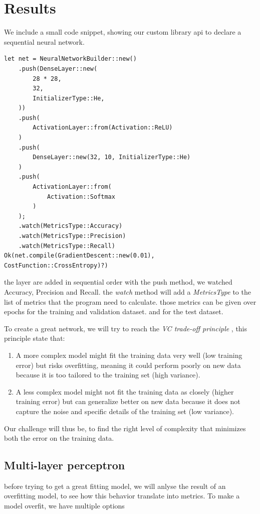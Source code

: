 \documentclass[a4paper, twocolumn, twoside]{article}
\begin{document}
	\section{Results}
	We include a small code snippet, showing our custom library api to declare a sequential neural network.

	\begin{verbatim}
let net = NeuralNetworkBuilder::new()
	.push(DenseLayer::new(
		28 * 28,
		32,
		InitializerType::He,
	))
	.push(
		ActivationLayer::from(Activation::ReLU)
	)
	.push(
		DenseLayer::new(32, 10, InitializerType::He)
	)
	.push(
		ActivationLayer::from(
			Activation::Softmax
		)
	);
	.watch(MetricsType::Accuracy)
	.watch(MetricsType::Precision)
	.watch(MetricsType::Recall)
Ok(net.compile(GradientDescent::new(0.01), CostFunction::CrossEntropy)?)
	\end{verbatim}

	the layer are added in sequential order with the push method, we watched Accuracy, Precision and Recall.
	the \textit{watch} method will add a \textit{MetricsType} to the list of metrics that the program need to calculate.
	those metrics can be given over epochs for the training and validation dataset. and for the test dataset.

	To create a great network, we will try to reach the \textit{VC trade-off principle} \cite{LeCun2019} \cite{vapnik1974theory},
	this principle state that:

	\begin{enumerate}
		\item A more complex model might fit the training data very well (low training error)
			but risks overfitting, meaning it could perform poorly on new data
			because it is too tailored to the training set (high variance).
		\item A less complex model might not fit the training data as closely 
			(higher training error) but can generalize better on new data because 
			it does not capture the noise and specific details of the training set (low variance).
	\end{enumerate}

	Our challenge will thus be, to find the right level of complexity that minimizes both the error on the training data.

	\subsection{Multi-layer perceptron}
	before trying to get a great fitting model, we will anlyse the result of an overfitting model, to see 
	how this behavior translate into metrics. To make a model overfit, we have multiple options
\end{document}
